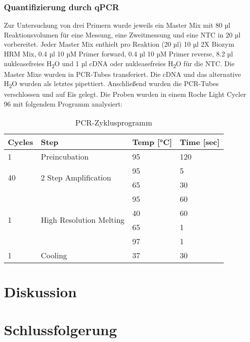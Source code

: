 \documentclass{article}
\begin{document}
\subsubsection*{Quantifizierung durch qPCR}
Zur Untersuchung von drei Primern wurde jeweils ein
Master Mix mit 80 µl Reaktionsvolumen für eine Messung,
eine Zweitmessung und eine NTC in 20 µl vorbereitet.
Jeder Master Mix enthielt pro Reaktion (20 µl) 10 µl 2X Biozym HRM Mix,
0.4 µl 10 µM Primer forward, 0.4 µl 10 µM Primer reverse, 8.2 µl
nukleasefreies H\textsubscript{2}O und 1 µl cDNA oder
nukleasefreies H\textsubscript{2}O für die NTC. Die Master Mixe
wurden in PCR-Tubes transferiert. Die cDNA und das
alternative H\textsubscript{2}O wurden als letztes pipettiert.
Anschließend wurden die PCR-Tubes verschlossen und auf Eis gelegt.
Die Proben wurden in einem Roche Light Cycler 96 mit folgendem
Programm analysiert:

\begin{table}[H]
    \centering
    \begin{tabular}{|l|l|l|l|}
    \hline
    \textbf{Cycles} & \textbf{Step} & \textbf{Temp [°C]} & \textbf{Time [sec]} \\ \hline
    1 & Preincubation & 95 & 120 \\ \hline
    \multirow{2}{*}{40} & \multirow{2}{*}{2 Step Amplification} & 95 & 5 \\ \cline{3-4}
     &  & 65 & 30 \\ \hline
    \multirow{4}{*}{1} & \multirow{4}{*}{High Resolution Melting} & 95 & 60 \\ \cline{3-4}
     &  & 40 & 60 \\ \cline{3-4}
     &  & 65 & 1 \\ \cline{3-4}
     &  & 97 & 1 \\ \hline
    1 & Cooling & 37 & 30 \\ \hline
    \end{tabular}
    \caption{PCR-Zyklusprogramm}
    \end{table}
  


\section{Diskussion}

\section{Schlussfolgerung}



\end{document}
